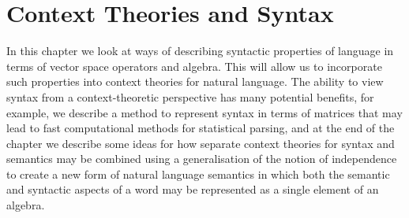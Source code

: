 %
%
%
%
%
%
%


%

%
%                

\chapter{Context Theories and Syntax} 
\label{syntax-chapter}

In this chapter we look at ways of describing syntactic properties of language in terms of vector space operators and algebra. This will allow us to incorporate such properties into context theories for natural language. The ability to view syntax from a context-theoretic perspective has many potential benefits, for example, we describe a method to represent syntax in terms of matrices that may lead to fast computational methods for statistical parsing, and at the end of the chapter we describe some ideas for how separate context theories for syntax and semantics may be combined using a generalisation of the notion of independence to create a new form of natural language semantics in which both the semantic and syntactic aspects of a word may be represented as a single element of an algebra.


